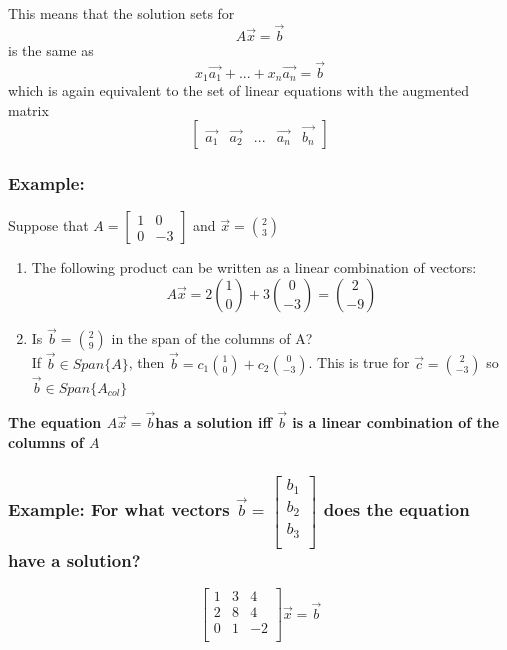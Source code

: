 \documentclass[12pt]{article} %
\newcommand{\mateq}{$A \vec{x} = \vec{b}$}
\begin{document}
This means that the solution sets for 
$$A\vec{x} = \vec{b}$$
is the same as
$$x_1\vec{a_1} + ... + x_n\vec{a_n} = \vec{b}$$
which is again equivalent to the set of linear equations with the augmented matrix
$$\begin{bmatrix}
	\vec{a_1} & \vec{a_2} & ... & \vec{a_n} & \vec{b_n}
\end{bmatrix}$$

\subsubsection{Example:} 
Suppose that $A = \begin{bmatrix}1 & 0\\ 0 & -3\end{bmatrix}$ and $\vec{x} = \binom{2}{3}$\\
\begin{enumerate}
\item The following product can be written as a linear combination of vectors:
$$A\vec{x} = 2 \binom{1}{0} + 3 \binom{0}{-3} = \binom{2}{-9}$$

\item Is $\vec{b} = \binom{2}{9}$ in the span of the columns of A?\\
If $\vec{b} \in Span\{A\}$, then $\vec{b} = c_1 \binom{1}{0} + c_2 \binom{0}{-3}$. This is true for $\vec{c} = \binom{2}{-3}$ so $\vec{b} \in Span\{A_{col}\}$
\end{enumerate}

\textbf{The equation \mateq  has a solution iff $\vec{b}$ is a linear combination of the columns of $A$}

\subsubsection{Example: For what vectors
$\vec{b} = \begin{bmatrix}b_1\\b_2\\b_3\\\end{bmatrix}$ does the equation have a solution?}
$$ \begin{bmatrix}
	1&3&4\\
	2&8&4\\
	0&1&-2\\
\end{bmatrix} \vec{x} = \vec{b}$$
\end{document}

